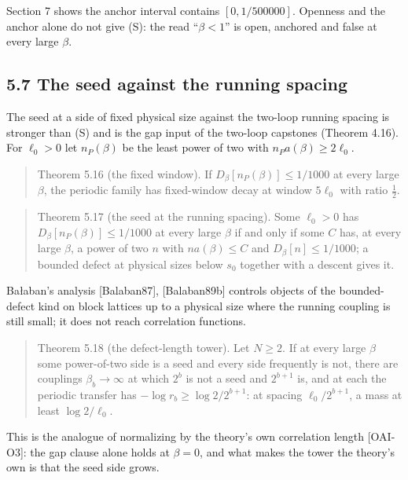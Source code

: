 \documentclass[10pt,letterpaper,twocolumn]{article}
\begin{document}
Section 7 shows the anchor interval contains \([0,1/500000]\). Openness and the anchor alone do not give (S): the read ``\(\beta<1\)'' is open, anchored and false at every large \(\beta\).

\subsection{5.7 The seed against the running spacing}\label{57-the-seed-against-the-running-spacing}

The seed at a side of fixed physical size against the two-loop running spacing is stronger than (S) and is the gap input of the two-loop capstones (Theorem 4.16). For \(\ell_0>0\) let \(n_P(\beta)\) be the least power of two with \(n_Pa(\beta)\ge2\ell_0\).

\begin{quote}
Theorem 5.16 (the fixed window). If \(D_\beta[n_P(\beta)]\le1/1000\) at every large \(\beta\), the periodic family has fixed-window decay at window \(5\ell_0\) with ratio \(\tfrac12\).
\end{quote}

\begin{quote}
Theorem 5.17 (the seed at the running spacing). Some \(\ell_0>0\) has \(D_\beta[n_P(\beta)]\le1/1000\) at every large \(\beta\) if and only if some \(C\) has, at every large \(\beta\), a power of two \(n\) with \(na(\beta)\le C\) and \(D_\beta[n]\le1/1000\); a bounded defect at physical sizes below \(s_0\) together with a descent gives it.
\end{quote}

Bałaban's analysis {[}Balaban87{]}, {[}Balaban89b{]} controls objects of the bounded-defect kind on block lattices up to a physical size where the running coupling is still small; it does not reach correlation functions.

\begin{quote}
Theorem 5.18 (the defect-length tower). Let \(N\ge2\). If at every large \(\beta\) some power-of-two side is a seed and every side frequently is not, there are couplings \(\beta_b\to\infty\) at which \(2^b\) is not a seed and \(2^{b+1}\) is, and at each the periodic transfer has \(-\log r_b\ge\log2/2^{b+1}\): at spacing \(\ell_0/2^{b+1}\), a mass at least \(\log2/\ell_0\).
\end{quote}

This is the analogue of normalizing by the theory's own correlation length {[}OAI-O3{]}: the gap clause alone holds at \(\beta=0\), and what makes the tower the theory's own is that the seed side grows.
\end{document}
